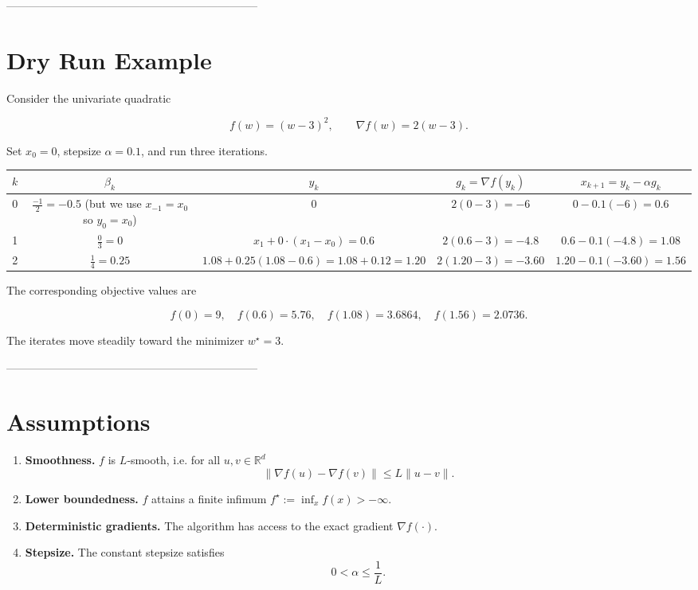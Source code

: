 \documentclass[11pt]{article}
\newcommand{\R}{\mathbb{R}}
\begin{document}
--------------------------------------------------------------------

\section*{Dry Run Example}
Consider the univariate quadratic  

\[
f(w)=(w-3)^2,\qquad \nabla f(w)=2(w-3).
\]

Set $x_0=0$, stepsize $\alpha=0.1$, and run three iterations.

\begin{center}
\begin{tabular}{c|c|c|c|c}
$k$ & $\beta_k$ & $y_k$ & $g_k=\nabla f(y_k)$ & $x_{k+1}=y_k-\alpha g_k$ \\ \hline
0 & $\displaystyle\frac{-1}{2}= -0.5$ (but we use $x_{-1}=x_0$ so $y_0=x_0$) & $0$ & $2(0-3)=-6$ & $0-0.1(-6)=0.6$ \\[2mm]
1 & $\displaystyle\frac{0}{3}=0$ & $x_1+0\cdot(x_1-x_0)=0.6$ & $2(0.6-3)=-4.8$ & $0.6-0.1(-4.8)=1.08$ \\[2mm]
2 & $\displaystyle\frac{1}{4}=0.25$ & $1.08+0.25(1.08-0.6)=1.08+0.12=1.20$ & $2(1.20-3)=-3.60$ & $1.20-0.1(-3.60)=1.56$
\end{tabular}
\end{center}

The corresponding objective values are  

\[
f(0)=9,\quad f(0.6)=5.76,\quad f(1.08)=3.6864,\quad f(1.56)=2.0736.
\]

The iterates move steadily toward the minimizer $w^\star=3$.

--------------------------------------------------------------------

\section*{Assumptions}
\begin{enumerate}[label=(A\arabic*)]
\item \textbf{Smoothness.} $f$ is $L$‑smooth, i.e. for all $u,v\in\R^{d}$  
\[
\|\nabla f(u)-\nabla f(v)\|\le L\|u-v\|. \tag{A1}
\]
\item \textbf{Lower boundedness.} $f$ attains a finite infimum $f^\star:=\inf_{x}f(x)>-\infty$. 
\item \textbf{Deterministic gradients.} The algorithm has access to the exact gradient $\nabla f(\cdot)$. 
\item \textbf{Stepsize.} The constant stepsize satisfies  
\[
0<\alpha\le\frac{1}{L}. \tag{A4}
\]
\end{enumerate}
\end{document}
